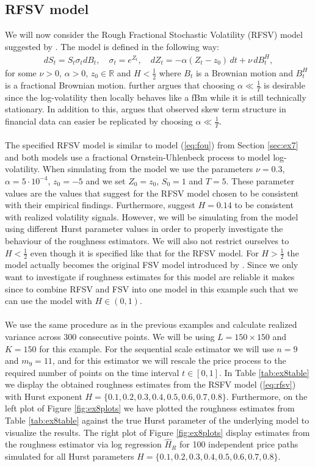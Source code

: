 \documentclass{article}
\begin{document}
\subsection{RFSV model}
We will now consider the Rough Fractional Stochastic Volatility (RFSV) model suggested by \cite{gatheral}. The model is defined in the following way:
\begin{align}
dS_t = S_t \sigma_t dB_t, \quad \sigma_t = e^{Z_t}, \quad dZ_t = -\alpha (Z_t-z_0) \, dt + \nu \, dB^H_t, \label{eq:rfsv}
\end{align}
for some $\nu>0$, $\alpha>0$, $z_0\in\mathbb{R}$ and $H<\frac{1}{2}$ where $B_t$ is a Brownian motion and $B^H_t$ is a fractional Brownian motion. \cite{gatheral} further argues that choosing $\alpha \ll \frac{1}{T}$ is desirable since the log-volatility then locally behaves like a fBm while it is still technically stationary. In addition to this, \cite{gatheral} argues that observed skew term structure in financial data can easier be replicated by choosing $\alpha \ll \frac{1}{T}$.\\\\
The specified RFSV model is similar to model (\ref{eq:fou}) from Section \ref{sec:ex7} and both models use a fractional Ornstein-Uhlenbeck process to model log-volatility. When simulating from the model we use the parameters $\nu = 0.3$, $\alpha = 5\cdot 10^{-4}$, $z_0 = -5$ and we set $Z_0=z_0$, $S_0 = 1$ and $T=5$. These parameter values are the values that \cite{gatheral} suggest for the RFSV model chosen to be consistent with their empirical findings. Furthermore, \cite{gatheral} suggest $H=0.14$ to be consistent with realized volatility signals. However, we will be simulating from the model using different Hurst parameter values in order to properly investigate the behaviour of the roughness estimators. We will also not restrict ourselves to $H<\frac{1}{2}$ even though it is specified like that for the RFSV model. For $H>\frac{1}{2}$ the model actually becomes the original FSV model introduced by \cite{comte}. Since we only want to investigate if roughness estimates for this model are reliable it makes since to combine RFSV and FSV into one model in this example such that we can use the model with $H\in (0,1)$.\\\\
We use the same procedure as in the previous examples and calculate realized variance across 300 consecutive points. We will be using $L=150\times 150$ and $K=150$ for this example. For the sequential scale estimator we will use $n=9$ and $m_9=11$, and for this estimator we will rescale the price process to the required number of points on the time interval $t\in[0,1]$. In Table \ref{tab:ex8table} we display the obtained roughness estimates from the RSFV model (\ref{eq:rfsv}) with Hurst exponent $H= \{0.1,0.2,0.3,0.4,0.5,0.6,0.7,0.8\}$. Furthermore, on the left plot of Figure \ref{fig:ex8plots} we have plotted the roughness estimates from Table \ref{tab:ex8table} against the true Hurst parameter of the underlying model to visualize the results. The right plot of Figure \ref{fig:ex8plots} display estimates from the roughness estimator via log regression $\widehat{H}_R$ for 100 independent price paths simulated for all Hurst parameters $H= \{0.1,0.2,0.3,0.4,0.5,0.6,0.7,0.8\}$.
\end{document}
